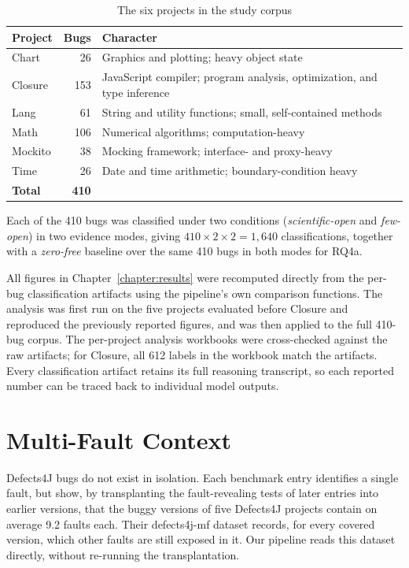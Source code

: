 \documentclass{iutbscthesis}
\begin{document}
\begin{table}[!htbp]
    \centering
    \begin{tabular}{l r p{8.2cm}}
        \toprule
        \textbf{Project} & \textbf{Bugs} & \textbf{Character} \\
        \midrule
        Chart & 26 & Graphics and plotting; heavy object state \\
        Closure & 153 & JavaScript compiler; program analysis, optimization, and type inference \\
        Lang & 61 & String and utility functions; small, self-contained methods \\
        Math & 106 & Numerical algorithms; computation-heavy \\
        Mockito & 38 & Mocking framework; interface- and proxy-heavy \\
        Time & 26 & Date and time arithmetic; boundary-condition heavy \\
        \midrule
        \textbf{Total} & \textbf{410} & \\
        \bottomrule
    \end{tabular}
    \caption{The six projects in the study corpus}
    \label{tab:study_corpus}
\end{table}

Each of the 410 bugs was classified under two conditions (\textit{scientific-open} and \textit{few-open}) in two evidence modes, giving $410 \times 2 \times 2 = 1{,}640$ classifications, together with a \textit{zero-free} baseline over the same 410 bugs in both modes for RQ4a.

All figures in Chapter~\ref{chapter:results} were recomputed directly from the per-bug classification artifacts using the pipeline's own comparison functions. The analysis was first run on the five projects evaluated before Closure and reproduced the previously reported figures, and was then applied to the full 410-bug corpus. The per-project analysis workbooks were cross-checked against the raw artifacts; for Closure, all 612 labels in the workbook match the artifacts. Every classification artifact retains its full reasoning transcript, so each reported number can be traced back to individual model outputs.

\section{Multi-Fault Context}
\label{sec:multifault}

Defects4J bugs do not exist in isolation. Each benchmark entry identifies a single fault, but \textcite{callaghan2024mf} show, by transplanting the fault-revealing tests of later entries into earlier versions, that the buggy versions of five Defects4J projects contain on average 9.2 faults each. Their defects4j-mf dataset records, for every covered version, which other faults are still exposed in it. Our pipeline reads this dataset directly, without re-running the transplantation.
\end{document}
